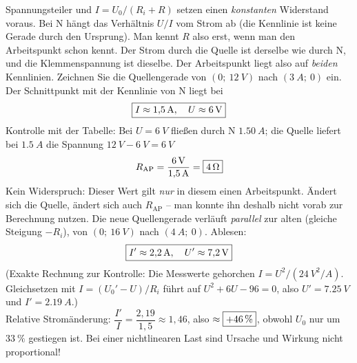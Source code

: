 \documentclass[11pt,a4paper]{article}
\begin{document}
\begin{loesung}
Spannungsteiler und $I = U_0/(R_i+R)$ setzen einen \emph{konstanten} Widerstand voraus. Bei N hängt das Verhältnis $U/I$ vom Strom ab (die Kennlinie ist keine Gerade durch den Ursprung). Man kennt $R$ also erst, wenn man den Arbeitspunkt schon kennt.
Der Strom durch die Quelle ist derselbe wie durch N, und die Klemmenspannung ist dieselbe. Der Arbeitspunkt liegt also auf \emph{beiden} Kennlinien. Zeichnen Sie die Quellengerade von $(0;\ \SI{12}{V})$ nach $(\SI{3}{A};\ 0)$ ein. Der Schnittpunkt mit der Kennlinie von N liegt bei
\[
  \boxed{I \approx \SI{1.5}{A}, \quad U \approx \SI{6}{V}}
\]
Kontrolle mit der Tabelle: Bei $U = \SI{6}{V}$ fließen durch N $\SI{1.50}{A}$; die Quelle liefert bei $\SI{1.5}{A}$ die Spannung $\SI{12}{V} - \SI{6}{V} = \SI{6}{V}$ \checkmark
{}
\[
  R_\text{AP} = \frac{\SI{6}{V}}{\SI{1.5}{A}} = \boxed{\SI{4}{\ohm}}
\]
Kein Widerspruch: Dieser Wert gilt \emph{nur} in diesem einen Arbeitspunkt. Ändert sich die Quelle, ändert sich auch $R_\text{AP}$ -- man konnte ihn deshalb nicht vorab zur Berechnung nutzen.
Die neue Quellengerade verläuft \emph{parallel} zur alten (gleiche Steigung $-R_i$), von $(0;\ \SI{16}{V})$ nach $(\SI{4}{A};\ 0)$. Ablesen:
\[
  \boxed{I' \approx \SI{2.2}{A}, \quad U' \approx \SI{7.2}{V}}
\]
(Exakte Rechnung zur Kontrolle: Die Messwerte gehorchen $I = U^2/(\SI{24}{V^2/A})$. Gleichsetzen mit $I = (U_0'-U)/R_i$ führt auf $U^2 + 6U - 96 = 0$, also $U' = \SI{7.25}{V}$ und $I' = \SI{2.19}{A}$.)\\
Relative Stromänderung: $\dfrac{I'}{I} = \dfrac{2{,}19}{1{,}5} \approx 1{,}46$, also $\approx\boxed{+\SI{46}{\percent}}$, obwohl $U_0$ nur um $\SI{33}{\percent}$ gestiegen ist. Bei einer nichtlinearen Last sind Ursache und Wirkung nicht proportional!
\end{loesung}
\end{document}
